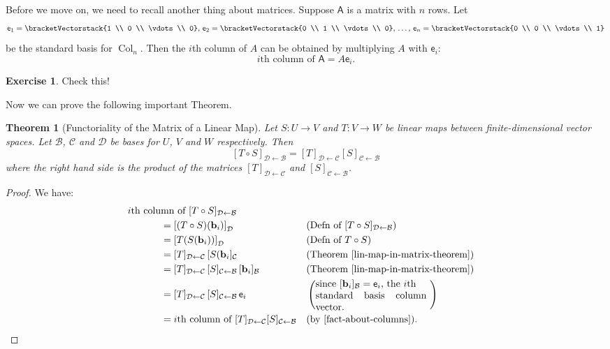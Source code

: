 \documentclass[a4paper,11pt]{book}
\newtheorem{theorem}{Theorem}
\theoremstyle{definition}
\newtheorem{exercise}{Exercise}
\newcommand{\be}{\begin{equation}}
\newcommand{\ee}{\end{equation}}
\newcommand{\ve}[1]{\mathbf{#1}}
\newcommand{\mat}[1]{\mathsf{#1}}
\newcommand{\basis}[1]{{\mathcal #1}}
\newcommand{\cvector}[1]{\bracketVectorstack{#1}}
\DeclareMathOperator{\Col}{Col}
\begin{document}
Before we move on, we need to recall another thing about matrices. Suppose $\mat{A}$ is a matrix with $n$ rows. Let
\[
 \mat{e}_1 = \cvector{1 \\ 0 \\ \vdots \\ 0}, \, \mat{e}_2 = \cvector{0 \\ 1 \\ \vdots \\ 0}, \, \ldots, \, \mat{e}_n = \cvector{0 \\ 0 \\ \vdots \\ 1} 
\]
be the standard basis for $\Col_n$. Then the $i$th column of $A$ can be obtained by multiplying $A$ with $\mat{e}_i$:
\be \label{fact-about-columns}
 \mbox{$i$th column of $\mat{A}$} = A \mat{e}_i.
\ee
\begin{exercise} \label{fact_about_columns_of_matrix} Check this!
\end{exercise}
Now we can prove the following important Theorem.
\begin{theorem}[Functoriality of the Matrix of a Linear Map]  \label{functoriality_of_matrix} Let $S : U \rightarrow V$ and $T : V \rightarrow W$ be linear maps between finite-dimensional vector spaces. Let $\basis{B}$, $\basis{C}$ and $\basis{D}$ be bases for $U$, $V$ and $W$ respectively. Then 
\[
 [T \circ S]_{\basis{D} \leftarrow \basis{B}} = [T]_{\basis{D} \leftarrow \basis{C}} [S]_{\basis{C} \leftarrow \basis{B}}
\]
where the right hand side is the product of the matrices $[T]_{\basis{D} \leftarrow \basis{C}}$ and $[S]_{\basis{C} \leftarrow \basis{B}}$.
\end{theorem}
\begin{proof} We have:
\begin{align*}
 \mbox{$i$th colu}&\mbox{mn of $[T \circ S]_{\basis{D} \leftarrow \basis{B}}$} \\
 &= \left[(T \circ S)(\ve{b}_i)\right]_\basis{D} && \mbox{(Defn of $[T \circ S]_{\basis{D} \leftarrow \basis{B}}$)} \\
 &= \left[T(S(\ve{b}_i))\right]_\basis{D} && \mbox{(Defn of $T \circ S$)} \\ 
 &= [T]_{\basis{D} \leftarrow \basis{C}} \, [S(\ve{b}_i]_\basis{C} && \mbox{(Theorem \ref{lin-map-in-matrix-theorem})} \\
 &= [T]_{\basis{D} \leftarrow \basis{C}} \, [S]_{\basis{C} \leftarrow \basis{B}} \, [\ve{b}_i]_\basis{B} && \mbox{(Theorem \ref{lin-map-in-matrix-theorem})} \\
 &= [T]_{\basis{D} \leftarrow \basis{C}} \, [S]_{\basis{C} \leftarrow \basis{B}} \, \mat{e}_i && \left(\mbox{\begin{minipage}{4cm}
since $[\ve{b}_i]_\basis{B} = \mat{e}_i$, the $i$th \\
standard basis column vector.
\end{minipage} } \right) \\
 &= \mbox{$i$th column of $[T]_{\basis{D} \leftarrow \basis{C}} [S]_{\basis{C} \leftarrow \basis{B}}$} && \mbox{(by \eqref{fact-about-columns})}.
\end{align*}
\end{proof}
\end{document}
